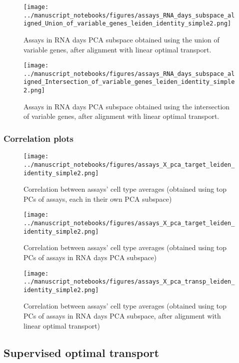 \documentclass[a4paper]{article}
\begin{document}
\begin{figure}[!htb]
  \centering
  \texttt{[image: ../manuscript\_notebooks/figures/assays\_RNA\_days\_subspace\_aligned\_Union\_of\_variable\_genes\_leiden\_identity\_simple2.png]}
  \caption{Assays in RNA days PCA subspace obtained using the union of variable genes, after alignment with linear optimal transport.}
\end{figure}

\begin{figure}[!htb]
  \centering
  \texttt{[image: ../manuscript\_notebooks/figures/assays\_RNA\_days\_subspace\_aligned\_Intersection\_of\_variable\_genes\_leiden\_identity\_simple2.png]}
  \caption{Assays in RNA days PCA subspace obtained using the intersection of variable genes, after alignment with linear optimal transport.}
\end{figure}

\FloatBarrier
\subsubsection{Correlation plots}

\begin{figure}[!htb]
  \centering
  \texttt{[image: ../manuscript\_notebooks/figures/assays\_X\_pca\_target\_leiden\_identity\_simple2.png]}
  \caption{Correlation between assays' cell type averages (obtained using top PCs of assays, each in their own PCA subspace)}
\end{figure}

\begin{figure}[!htb]
  \centering
  \texttt{[image: ../manuscript\_notebooks/figures/assays\_X\_pca\_target\_leiden\_identity\_simple2.png]}
  \caption{Correlation between assays' cell type averages (obtained using top PCs of assays in RNA days PCA subspace)}
\end{figure}

\begin{figure}[!htb]
  \centering
  \texttt{[image: ../manuscript\_notebooks/figures/assays\_X\_pca\_transp\_leiden\_identity\_simple2.png]}
  \caption{Correlation between assays' cell type averages (obtained using top PCs of assays in RNA days PCA subspace, after alignment with linear optimal transport)}
\end{figure}

\FloatBarrier
\subsection{Supervised optimal transport}
\end{document}
